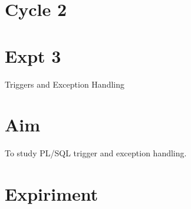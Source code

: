\documentclass[13pt,oneside]{book}
\begin{document}
\section*{Cycle 2}
\section*{Expt 3}
\begin{center}
    \Large{Triggers and Exception Handling}
\end{center}

\section*{Aim}
\large To study PL/SQL trigger and exception handling.

\section*{Expiriment}
\end{document}
